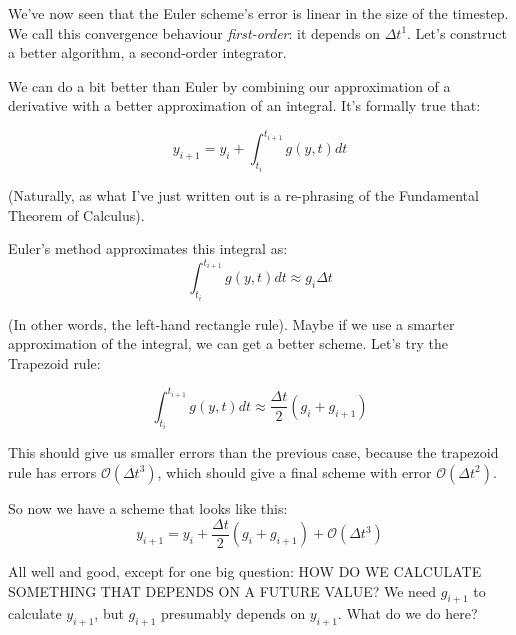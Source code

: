 \documentclass{article}
\theoremstyle{demo}
\begin{document}
We've now seen that the Euler scheme's error is linear in the size of the
timestep.  We call this convergence behaviour \textit{first-order}: it depends
on $\Delta t^1$.  Let's construct a better algorithm, a second-order integrator.

We can do a bit better than Euler by combining our approximation of a derivative
with a better approximation of an integral.  It's formally true that:

\begin{equation}
    y_{i+1} = y_i + \int_{t_i}^{t_{i+1}} g(y,t) dt
\end{equation}

(Naturally, as what I've just written out is a re-phrasing of the Fundamental
Theorem of Calculus).

Euler's method approximates this integral as:
\begin{equation}
    \int_{t_i}^{t_{i+1}} g(y,t) dt \approx g_i\Delta t
\end{equation}

(In other words, the left-hand rectangle rule).  Maybe if we use a smarter
approximation of the integral, we can get a better scheme.  Let's try the
Trapezoid rule:

\begin{equation}
    \int_{t_i}^{t_{i+1}} g(y,t) dt \approx \frac{\Delta t}{2}(g_i + g_{i+1})
\end{equation}

This should give us smaller errors than the previous case, because the trapezoid
rule has errors $\mathcal{O}(\Delta t^3)$, which should give a final scheme with
error $\mathcal{O}(\Delta t^2)$.

So now we have a scheme that looks like this:
\begin{equation}
    y_{i+1} = y_i + \frac{\Delta t}{2}(g_i+g_{i+1}) + \mathcal{O}(\Delta t^3)
\end{equation}

All well and good, except for one big question:  HOW DO WE CALCULATE SOMETHING
THAT DEPENDS ON A FUTURE VALUE?  We need $g_{i+1}$ to calculate $y_{i+1}$, but
$g_{i+1}$ presumably depends on $y_{i+1}$.  What do we do here?
\end{document}
